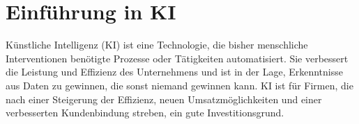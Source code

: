 \section{Einführung in KI}

Künstliche Intelligenz (KI) ist eine Technologie, die bisher menschliche 
Interventionen benötigte Prozesse oder Tätigkeiten automatisiert. 
Sie verbessert die Leistung und Effizienz des Unternehmens und ist in der Lage, 
Erkenntnisse aus Daten zu gewinnen, die sonst niemand gewinnen kann.
KI ist für Firmen, die nach einer Steigerung der Effizienz, 
neuen Umsatzmöglichkeiten und einer verbesserten Kundenbindung streben,
ein gute Investitionsgrund.